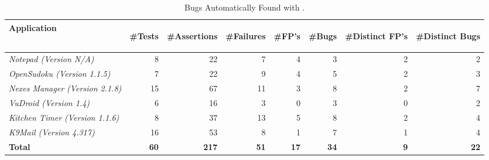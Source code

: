 \begin{table}[t!]
\vspace*{-3ex}
\centering
\caption{Bugs Automatically Found with \tool.}
\label{table:bugsFound}
{
\begin{tabular}{lrrrrrrr}
\toprule
\bf{Application}&\begin{sideways}\bf{\#Tests}\end{sideways}&\begin{sideways}\bf{\#Assertions}\end{sideways}&\begin{sideways}\bf{\#Failures}\end{sideways}&\begin{sideways}\bf{\#FP's}\end{sideways}&\begin{sideways}\bf{\#Bugs}\end{sideways}&\begin{sideways}\bf{\#Distinct FP's}\end{sideways}&\begin{sideways}\bf{\#Distinct Bugs}\end{sideways}\\
\midrule
\textit{Notepad (Version N/A)}&8&22&7&4&3&2&2\\
\textit{OpenSudoku (Version 1.1.5)}&7&22&9&4&5&2&3\\
\textit{Nexes Manager (Version 2.1.8)}&15&67&11&3&8&2&7\\
\midrule
\textit{VuDroid (Version 1.4)}&6&16&3&0&3&0&2\\
\textit{Kitchen Timer (Version 1.1.6)}&8&37&13&5&8&2&4\\
\textit{K9Mail (Version 4.317)}&16&53&8&1&7&1&4\\
\midrule
\bf{Total}&\bf 60&\bf 217&\bf 51&\bf 17&\bf 34&\bf 9&\bf 22\\
\bottomrule
\end{tabular}
}
\end{table}

